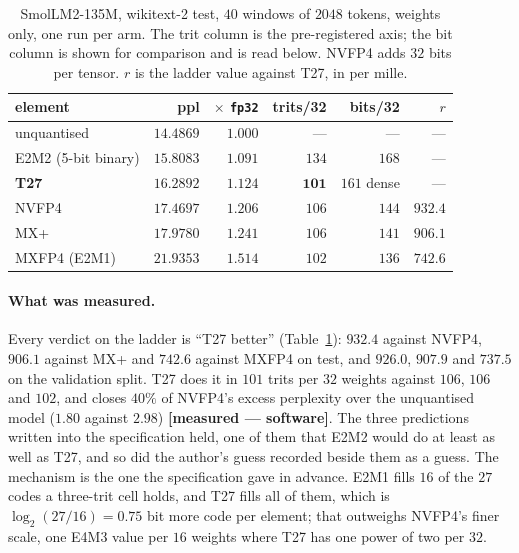 \begin{table}[t]\centering
\caption{SmolLM2-135M, wikitext-2 test, $40$ windows of $2048$ tokens, weights
only, one run per arm. The trit column is the pre-registered axis; the bit
column is shown for comparison and is read below. NVFP4 adds $32$ bits per
tensor. $r$ is the ladder value against T27, in per mille.}
\label{tab:t27block}
\begin{tabular}{lrrrrr}
\toprule
element & ppl & $\times$ \texttt{fp32} & trits/32 & bits/32 & $r$ \\
\midrule
unquantised                  & $14.4869$ & $1.000$ & ---   & ---        & ---     \\
E2M2 (5-bit binary)          & $15.8083$ & $1.091$ & $134$ & $168$      & ---     \\
\textbf{T27}                 & $\mathbf{16.2892}$ & $1.124$ & $\mathbf{101}$ & $161$ dense & ---     \\
NVFP4                        & $17.4697$ & $1.206$ & $106$ & $144$      & $932.4$ \\
MX+                          & $17.9780$ & $1.241$ & $106$ & $141$      & $906.1$ \\
MXFP4 (E2M1)                 & $21.9353$ & $1.514$ & $102$ & $136$      & $742.6$ \\
\bottomrule
\end{tabular}
\end{table}

\paragraph{What was measured.} Every verdict on the ladder is ``T27 better''
(Table~\ref{tab:t27block}): $932.4$ against NVFP4, $906.1$ against MX+ and
$742.6$ against MXFP4 on test, and $926.0$, $907.9$ and $737.5$ on the
validation split. T27 does it in $101$ trits per $32$ weights against $106$,
$106$ and $102$, and closes $40\%$ of NVFP4's excess perplexity over the
unquantised model ($1.80$ against $2.98$) \textbf{[measured --- software]}. The
three predictions written into the specification held, one of them that E2M2
would do at least as well as T27, and so did the author's guess recorded beside
them as a guess. The mechanism is the one the specification
gave in advance. E2M1 fills $16$ of the $27$ codes a three-trit cell holds, and
T27 fills all of them, which is $\log_2(27/16)=0.75$ bit more code per
element; that outweighs NVFP4's finer scale, one E4M3 value per $16$ weights
where T27 has one power of two per $32$.

